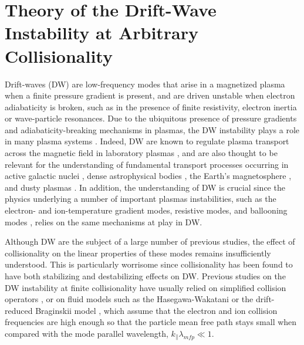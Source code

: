 \chapter{Theory of the Drift-Wave Instability at Arbitrary Collisionality}
\label{ch:dwi}

Drift-waves (DW) are low-frequency modes that arise in a magnetized plasma when a finite pressure gradient is present, and are driven unstable when electron adiabaticity is broken, such as in the presence of finite resistivity, electron inertia or wave-particle resonances.
%
Due to the ubiquitous presence of pressure gradients and adiabaticity-breaking mechanisms in plasmas, the DW instability plays a role in many plasma systems \citep{Goldston1995}.
%
Indeed, DW are known to regulate plasma transport across the magnetic field in laboratory plasmas \citep{Horton1999,Scott2002,Burin2005,Poli2008,Schaffner2012,Mosetto2013}, and are also thought to be relevant for the understanding of fundamental transport processes occurring in active galactic nuclei \citep{Saleem2003}, dense astrophysical bodies \citep{Wu2008}, the Earth's magnetosphere \citep{Shukla1980}, and dusty plasmas \citep{Salimullah2009}.
%
In addition, the understanding of DW is crucial since the physics underlying a number of important plasmas instabilities, such as the electron- and ion-temperature gradient modes, resistive modes, and ballooning modes \citep{Stix1992}, relies on the same mechanisms at play in DW.

Although DW are the subject of a large number of previous studies, the effect of collisionality on the linear properties of these modes remains insufficiently understood. 
%
This is particularly worrisome since collisionality has been found to have both stabilizing \citep{Stix1992} and destabilizing effects \citep{White2014} on DW.
%
Previous studies on the DW instability at finite collisionality have usually relied on simplified collision operators \citep{Angus2012}, or on fluid models such as the Hasegawa-Wakatani \citep{Hasegawa1983} or the drift-reduced Braginskii model \citep{Ricci2012a}, which assume that the electron and ion collision frequencies are high enough so that the particle mean free path stays small when compared with the mode parallel wavelength, $k_\parallel \lambda_{mfp} \ll 1$.


